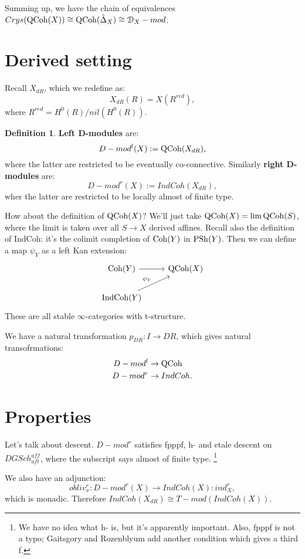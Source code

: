 \documentclass[10pt,a4paper,reqno,oneside]{book} %
\theoremstyle{plain}
\theoremstyle{definition}
\newtheorem{defin}[thm]{Definition}
\theoremstyle{remark}
\numberwithin{equation}{section}
\begin{document}
Summing up, we have the chain of equivalences $Crys(\mathrm{QCoh}(X)) \cong \mathrm{QCoh}(\hat \Delta_X) \cong \mathcal{D}_X - mod$.


\section{Derived setting}
Recall $X_{dR}$, which we redefine as:
\[	X_{dR}(R) = X(R^{red}),	\]
where $R^{red} = H^0(R) / nil(H^0(R))$.

\begin{defin}
\textbf{Left D-modules} are:
\[	D-mod^l (X) := \mathrm{QCoh}(X_{dR}),	\]
where the latter are restricted to be eventually co-connective. Similarly \textbf{right D-modules} are:
\[	D-mod^r (X) := IndCoh(X_{dR}),	\]
wher the latter are restricted to be locally almost of finite type.
\end{defin}

How about the definition of $\mathrm{QCoh}(X)$? We'll just take $\mathrm{QCoh}(X) = \lim \mathrm{QCoh}(S)$, where the limit is taken over all
$S \to X$ derived affines. Recall also the definition of IndCoh: it's the colimit completion of $\mathrm{Coh}(Y)$ in
$\mathrm{PSh}(Y)$. Then we can define a map $\psi_Y$ as a left Kan extension:
\[
\begin{tikzcd}
\Coh(Y) \arrow{r} & \QCoh(X) \\
\IndCoh(Y) \arrow{ur}{\psi_Y} &
\end{tikzcd}
\]
These are all stable $\infty$-categories with t-structure. 

We have a natural transformation $p_{DR} : I \to DR$, which gives natural transofrmations:
\begin{align*}
D-mod^l &\to \mathrm{QCoh} \\
D-mod^r &\to IndCoh.
\end{align*}



\section{Properties}

Let's talk about descent. $D-mod^r$ satisfies fpppf, h- and etale descent on $DGSch_{aft}^{aff}$, where the subscript says
almost of finite type. \footnote{We have no idea what h- is, but it's apparently important. Also, fpppf is not a typo;
Gaitsgory and Rozenblyum add another condition which gives a third f.}

We also have an adjunction:
\[	obliv_x^r : D-mod^r(X) \to IndCoh(X) : ind_X^r,	\]
which is monadic. Therefore $IndCoh(X_{dR}) \cong T-mod (IndCoh(X))$.
\end{document}
